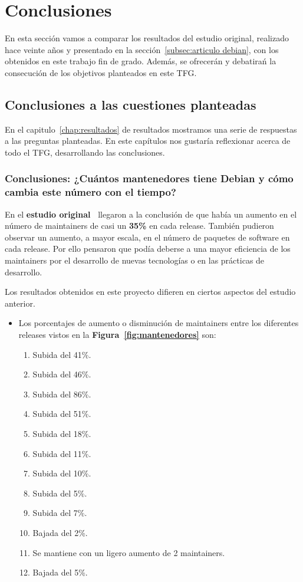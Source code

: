 \documentclass[a4paper, 12pt]{book}
\begin{document}
\cleardoublepage
\chapter{Conclusiones}
\label{chap:conclusiones}
En esta sección vamos a comparar los resultados del estudio original, realizado hace veinte años y presentado en la sección~\ref{subsec:articulo debian}, con los obtenidos en este trabajo fin de grado. Además, se ofrecerán y debatirań la consecución de los objetivos planteados en este TFG.

\section{Conclusiones a las cuestiones planteadas}
\label{sec:conclusiones-cuestiones}
En el capitulo~\ref{chap:resultados} de resultados mostramos una serie de respuestas a las preguntas planteadas. En este capítulos nos gustaría reflexionar acerca de todo el TFG, desarrollando las conclusiones.

\subsection{Conclusiones: ¿Cuántos mantenedores tiene Debian y cómo cambia este número con el tiempo?}
\label{subsec:conclusion_1}
En el \textbf{estudio original~\cite{robles05:_debian}} llegaron a la conclusión de que había un aumento en el número de maintainers de casi un \textbf{35\%} en cada release. También pudieron observar un aumento, a mayor escala, en el número de paquetes de software en cada release. Por ello pensaron que podía deberse a una mayor eficiencia de los maintainers por el desarrollo de nuevas tecnologías o en las prácticas de desarrollo.

Los resultados obtenidos en este proyecto difieren en ciertos aspectos del estudio anterior.
\begin{itemize}
	\item Los porcentajes de aumento o disminución de maintainers entre los diferentes releases vistos en la \textbf{Figura~\ref{fig:mantenedores}} son: 
	\begin{enumerate}
		\item Subida del 41\%.
		\item Subida del 46\%.
		\item Subida del 86\%.
		\item Subida del 51\%.
		\item Subida del 18\%.
		\item Subida del 11\%.
		\item Subida del 10\%.
		\item Subida del 5\%.
		\item Subida del 7\%.
		\item Bajada del 2\%.
		\item Se mantiene con un ligero aumento de 2 maintainers.
		\item Bajada del 5\%.
	\end{enumerate}
\end{itemize}
\end{document}
